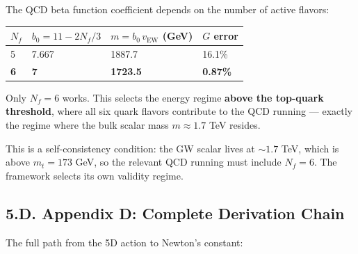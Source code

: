 \documentclass[
  11pt,
]{article}
\begin{document}
The QCD beta function coefficient depends on the number of active
flavors:

\begin{longtable}[]{@{}llll@{}}
\toprule
\(N_f\) & \(b_0 = 11 - 2N_f/3\) & \(m = b_0\,v_{\text{EW}}\) (GeV) &
\(G\) error\tabularnewline
\midrule
\endhead
5 & 7.667 & 1887.7 & 16.1\%\tabularnewline
\textbf{6} & \textbf{7} & \textbf{1723.5} &
\textbf{0.87\%}\tabularnewline
\bottomrule
\end{longtable}

Only \(N_f = 6\) works. This selects the energy regime \textbf{above the
top-quark threshold}, where all six quark flavors contribute to the QCD
running --- exactly the regime where the bulk scalar mass
\(m \approx 1.7\) TeV resides.

This is a self-consistency condition: the GW scalar lives at
\(\sim 1.7\) TeV, which is above \(m_t = 173\) GeV, so the relevant QCD
running must include \(N_f = 6\). The framework selects its own validity
regime.

\bigskip

\hypertarget{d.-appendix-d-complete-derivation-chain}{%
\subsection{5.D. Appendix D: Complete Derivation
Chain}\label{d.-appendix-d-complete-derivation-chain}}

The full path from the 5D action to Newton's constant:
\end{document}
